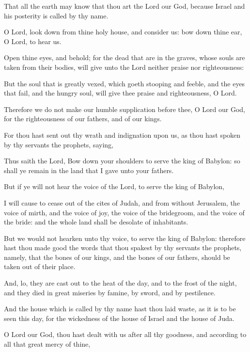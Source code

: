 {\par }{\PP {}That all the earth may know that thou art the Lord our God, because Israel and his posterity is called by thy name.
\par }{\PP {}O Lord, look down from thine holy house, and consider us: bow down thine ear, O Lord, to hear us.
\par }{\PP {}Open thine eyes, and behold; for the dead that are in the graves, whose souls are taken from their bodies, will give unto the Lord neither praise nor righteousness:
\par }{\PP {}But the soul that is greatly vexed, which goeth stooping and feeble, and the eyes that fail, and the hungry soul, will give thee praise and righteousness, O Lord.
\par }{\PP {}Therefore we do not make our humble supplication before thee, O Lord our God, for the righteousness of our fathers, and of our kings.
\par }{\PP {}For thou hast sent out thy wrath and indignation upon us, as thou hast spoken by thy servants the prophets, saying,
\par }{\PP {}Thus saith the Lord, Bow down your shoulders to serve the king of Babylon: so shall ye remain in the land that I gave unto your fathers.
\par }{\PP {}But if ye will not hear the voice of the Lord, to serve the king of Babylon,
\par }{\PP {}I will cause to cease out of the cites of Judah, and from without Jerusalem, the voice of mirth, and the voice of joy, the voice of the bridegroom, and the voice of the bride: and the whole land shall be desolate of inhabitants.
\par }{\PP {}But we would not hearken unto thy voice, to serve the king of Babylon: therefore hast thou made good the words that thou spakest by thy servants the prophets, namely, that the bones of our kings, and the bones of our fathers, should be taken out of their place.
\par }{\PP {}And, lo, they are cast out to the heat of the day, and to the frost of the night, and they died in great miseries by famine, by sword, and by pestilence.
\par }{\PP {}And the house which is called by thy name hast thou laid waste, as it is to be seen this day, for the wickedness of the house of Israel and the house of Juda.
\par }{\PP {}O Lord our God, thou hast dealt with us after all thy goodness, and according to all that great mercy of thine,
}
